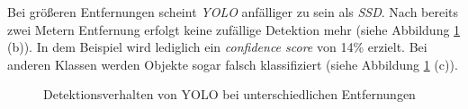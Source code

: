 Bei größeren Entfernungen scheint \textit{YOLO} anfälliger zu sein als \textit{SSD}. Nach bereits zwei Metern Entfernung erfolgt keine zufällige Detektion mehr (siehe Abbildung \ref{entfernung_yolo} (b)). In dem Beispiel wird lediglich ein \textit{confidence score} von 14\% erzielt. Bei anderen Klassen werden Objekte sogar falsch klassifiziert (siehe Abbildung \ref{entfernung_yolo} (c)).

\begin{figure}[H]
	\hfill
	\hfill
	\hfill
	\hfill
	\caption{Detektionsverhalten von YOLO bei unterschiedlichen Entfernungen}
	\label{entfernung_yolo}
\end{figure}

